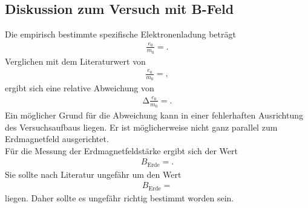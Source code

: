 \subsection{Diskussion zum Versuch mit B-Feld}
Die empirisch bestimmte spezifische Elektronenladung beträgt
\begin{align*}
  \frac{e_0}{m_0} = .
\end{align*}
Verglichen mit dem Literaturwert \cite{Konstanten} von
\begin{align*}
  \frac{e_0}{m_0} = ,
\end{align*}
ergibt sich eine relative Abweichung von
\begin{align*}
  \increment{\frac{e_0}{m_0}} = .
\end{align*}
Ein möglicher Grund für die Abweichung kann in einer fehlerhaften Ausrichtung des Versuchsaufbaus liegen.
Er ist möglicherweise nicht ganz parallel zum Erdmagnetfeld ausgerichtet.\\
Für die Messung der Erdmagnetfeldstärke ergibt sich der Wert
\begin{align*}
  B_{\text{Erde}} = .
\end{align*}
Sie sollte nach Literatur \cite{erde} ungefähr um den Wert
\begin{align*}
  B_{\text{Erde}} = 
\end{align*}
liegen.
Daher sollte es ungefähr richtig bestimmt worden sein.
